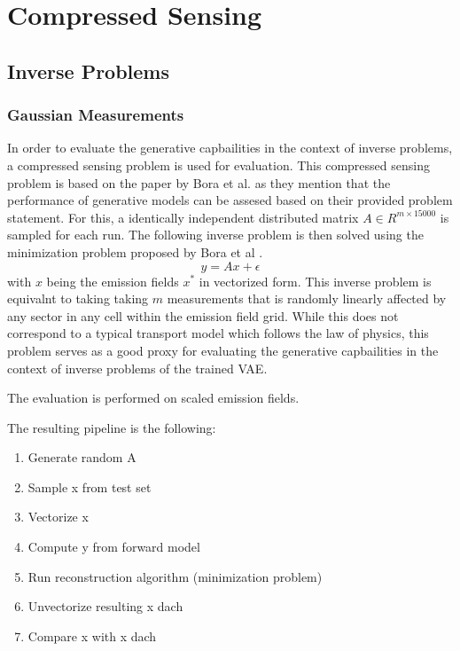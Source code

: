 
\chapter{Compressed Sensing}\label{chapter:compressed_sensing}

\section{Inverse Problems}

\subsection{Gaussian Measurements}
In order to evaluate the generative capbailities in the context of inverse problems, a compressed sensing problem is used for evaluation.
This compressed sensing problem is based on the paper by Bora et al. as they mention that the performance of generative models can be assesed based on their provided problem statement.
For this, a identically independent distributed matrix $A \in R^{m \times 15000}$ is sampled for each run.
The following inverse problem is then solved using the minimization problem proposed by Bora et al \parencite{CSUsingAI}.
\begin{equation}
    y = A x + \epsilon
\end{equation}
with $x$ being the emission fields $x^*$ in vectorized form.
This inverse problem is equivalnt to taking taking $m$ measurements that is randomly linearly affected by any sector in any cell within the emission field grid.
While this does not correspond to a typical transport model which follows the law of physics, this problem serves as a good proxy for evaluating the generative capbailities in the context of inverse problems of the trained VAE. 

The evaluation is performed on scaled emission fields.

The resulting pipeline is the following:
\begin{enumerate}
    \item Generate random A
    \item Sample x from test set
    \item Vectorize x
    \item Compute y from forward model
    \item Run reconstruction algorithm (minimization problem)
    \item Unvectorize resulting x dach
    \item Compare x with x dach
\end{enumerate}

